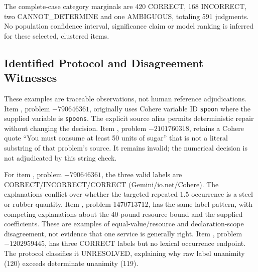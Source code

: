 The complete-case category marginals are 420 CORRECT, 168 INCORRECT, two CANNOT\_DETERMINE and one AMBIGUOUS, totaling 591 judgments. No population confidence interval, significance claim or model ranking is inferred for these selected, clustered items.

\subsection{Identified Protocol and Disagreement Witnesses}
These examples are traceable observations, not human reference adjudications. Item , problem $-790646361$, originally uses Cohere variable ID \texttt{spoon} where the supplied variable is \texttt{spoons}. The explicit source alias permits deterministic repair without changing the decision. Item , problem $-2101760318$, retains a Cohere quote ``You must consume at least 50 units of sugar'' that is not a literal substring of that problem's source. It remains invalid; the numerical decision is not adjudicated by this string check.

For item , problem $-790646361$, the three valid labels are CORRECT/INCORRECT/CORRECT (Gemini/io.net/Cohere). The explanations conflict over whether the targeted repeated 1.5 occurrence is a steel or rubber quantity. Item , problem 1470713712, has the same label pattern, with competing explanations about the 40-pound resource bound and the supplied coefficients. These are examples of equal-value/resource and declaration-scope disagreement, not evidence that one service is generally right. Item , problem $-1202959445$, has three CORRECT labels but no lexical occurrence endpoint. The protocol classifies it UNRESOLVED, explaining why raw label unanimity (120) exceeds determinate unanimity (119).

